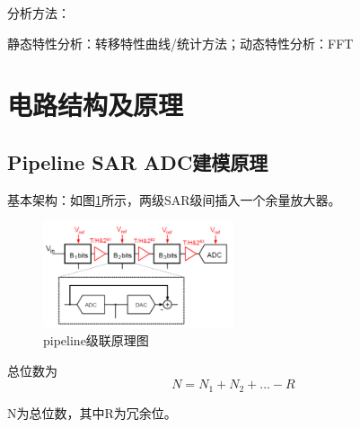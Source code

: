 \documentclass[cs4size,a4paper]{ctexart}
\numberwithin{equation}{section}
\numberwithin{table}{section}
\numberwithin{figure}{section}
\begin{document}
\noindent
分析方法：

静态特性分析：转移特性曲线/统计方法；动态特性分析：FFT

\section{电路结构及原理}

    \subsection{Pipeline SAR ADC建模原理}
        基本架构：如图\ref{fig:circuit1}所示，两级SAR级间插入一个余量放大器。
        	\begin{figure}[H]
        		\centering
        		\includegraphics[width=0.5\textwidth]{figure/circuit1.jpg}
        		\caption{pipeline级联原理图} \label{fig:circuit1}
        	\end{figure}
        	
        总位数为
            \begin{equation}
                N=N_1+N_2+...-R
            \end{equation}
            
        N为总位数，其中R为冗余位。
        
\end{document}
